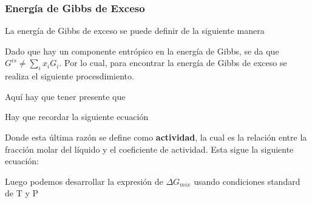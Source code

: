 
\subsubsection{Energía de Gibbs de Exceso}

La energía de Gibbs de exceso se puede definir de la siguiente manera


Dado que hay un componente entrópico en la energía de Gibbs, se da que $G^{is}≠ \sum_i x_iG_i$. Por lo cual, para encontrar la energía de Gibbs de exceso se realiza el siguiente procesdimiento.


Aquí hay que tener presente que 

Hay que recordar la siguiente ecuación


Donde esta última razón se define como \textbf{actividad}, la cual es la relación entre la fracción molar del líquido y el coeficiente de actividad. Esta sigue la siguiente ecuación:


Luego podemos desarrollar la expresión de $\Delta G_{mix}$ usando condiciones standard de T y P



